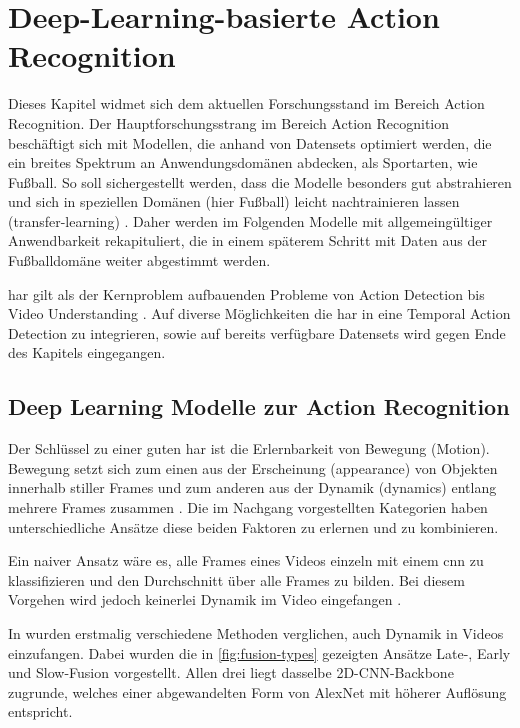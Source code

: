 \label{ch:sota}
\chapter{Deep-Learning-basierte Action Recognition}

Dieses Kapitel widmet sich dem aktuellen Forschungsstand im Bereich Action Recognition.
Der Hauptforschungsstrang im Bereich Action Recognition beschäftigt sich mit Modellen, die anhand von Datensets optimiert werden, die ein breites Spektrum an Anwendungsdomänen abdecken, als Sportarten, wie Fußball.
So soll sichergestellt werden, dass die Modelle besonders gut abstrahieren und sich in speziellen Domänen (hier Fußball) leicht nachtrainieren lassen (\gls{transfer-learning}) \cite{Burkov19}.
Daher werden im Folgenden Modelle mit allgemeingültiger Anwendbarkeit rekapituliert, die in einem späterem Schritt mit Daten aus der Fußballdomäne weiter abgestimmt werden.

\gls{har} gilt als der Kernproblem aufbauenden Probleme von Action Detection bis Video Understanding \cite{Jiang19} \cite{Xia20}.
Auf diverse Möglichkeiten die \gls{har} in eine Temporal Action Detection zu integrieren, sowie auf bereits verfügbare Datensets wird gegen Ende des Kapitels eingegangen.

\section{Deep Learning Modelle zur Action Recognition}
\label{sec:deep-learning-modelle-zur-action-recognition}

Der Schlüssel zu einer guten \gls{har} ist die Erlernbarkeit von Bewegung (Motion).
Bewegung setzt sich zum einen aus der Erscheinung (appearance) von Objekten innerhalb stiller Frames und zum anderen aus der Dynamik (dynamics) entlang mehrere Frames zusammen \cite{Sun15} \cite{Wang16}.
Die im Nachgang vorgestellten Kategorien haben unterschiedliche Ansätze diese beiden Faktoren zu erlernen und zu kombinieren.

Ein naiver Ansatz wäre es, alle Frames eines Videos einzeln mit einem \gls{cnn} zu klassifizieren und den Durchschnitt über alle Frames zu bilden.
Bei diesem Vorgehen wird jedoch keinerlei Dynamik im Video eingefangen \cite{Karpathy14}.

In \cite{Karpathy14} wurden erstmalig verschiedene Methoden verglichen, auch Dynamik in Videos einzufangen.
Dabei wurden die in \autoref{fig:fusion-types} gezeigten Ansätze Late-, Early und Slow-Fusion vorgestellt.
Allen drei liegt dasselbe 2D-CNN-Backbone zugrunde, welches einer abgewandelten Form von AlexNet mit höherer Auflösung entspricht.

